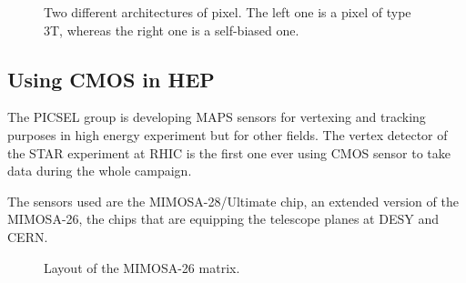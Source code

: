     \begin{figure}
      \caption{Two different architectures of pixel. The left one is a pixel of type 3T, whereas the right one is a self-biased one.}
    \end{figure}

    \subsection{Using CMOS in HEP}

    The PICSEL group is developing \gls{MAPS} sensors for vertexing and tracking purposes in high energy experiment but for other fields.
    The vertex detector of the STAR experiment at RHIC is the first one ever using \gls{CMOS} sensor to take data during the whole campaign.
    
    The sensors used are the \gls{MIMOSA}-28/Ultimate chip, an extended version of the \gls{MIMOSA}-26, the chips that are equipping the telescope planes at DESY and CERN.

    \begin{figure}
      \caption{Layout of the MIMOSA-26 matrix.}
    \end{figure}

